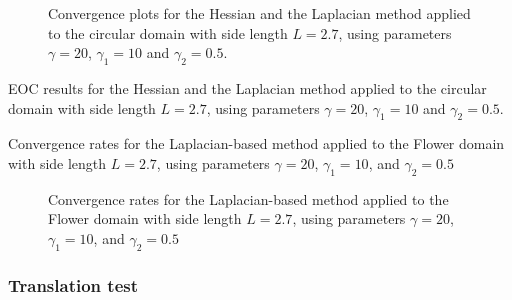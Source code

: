\documentclass[11pt]{article}
\theoremstyle{remark}
\numberwithin{equation}{section}
\begin{document}
\begin{figure}[h!]
\centering
\subfloat[Hessian]{}
\subfloat[Laplace]{}

\caption{ Convergence plots for the Hessian and the Laplacian method applied to the circular domain with side length $L=2.7$, using parameters $\gamma=20$, $\gamma_1=10$ and $\gamma_2= 0.5$.}
\label{fig:conv_hes_lap}
\end{figure}



\begin{table}

\begin{minipage}{1.0\textwidth}
    \centering
    \subfloat[Hessian]{}
\end{minipage}%

\bigskip
\begin{minipage}{1.0\textwidth}
    \centering
    \subfloat[Laplace]{}
\end{minipage}
\caption{EOC results for the Hessian and the Laplacian method applied to the circular domain with side length $L=2.7$, using parameters $\gamma=20$, $\gamma_1=10$ and $\gamma_2= 0.5$.}
\label{tab:conv_hes_lap}
\end{table}


\begin{table} 
\caption{Convergence rates for the Laplacian-based method applied to the Flower domain with side length $L=2.7$, using parameters $\gamma=20$, $\gamma_1=10$, and $\gamma_2= 0.5$}
\label{tab:conv_flower_lap}
\end{table}
\begin{figure}[h!]
    \centering

\caption{Convergence rates for the Laplacian-based method applied to the Flower domain with side length $L=2.7$, using parameters $\gamma=20$, $\gamma_1=10$, and $\gamma_2= 0.5$}
\label{fig:conv_flower_lap}
\end{figure}


\newpage
\subsubsection{Translation test}%
\label{ssub:translation_test}
\end{document}
